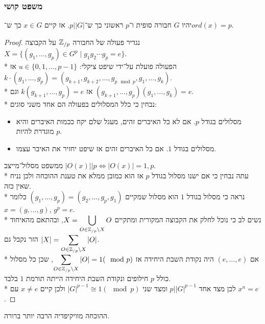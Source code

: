 \subsubsection{משפט קושי}
יהיו $G$ חבורה סופית ו־$p$ ראשוני כך ש־$p \Big| |G|$. אז קיים $x \in G$ כך ש־$ord(x) = p$.
\begin{proof}
	נגדיר פעולה של החבורה $\mathbb{Z}_{/p}$ על הקבוצה $X = \{ (g_1, \dots, g_p) \in G^p \mid g_1g_2 \cdots g_p = e\}$. \\*
	הפעולה פועלת על־ידי שיפט ציקלי: $u \in \{0, 1, \dots, p - 1\}$ אז $k \cdot (g_1, \dots, g_p) = (g_{k + 1}, g_{k + 2}, \dots, g_{p \mod p}, g_{1}, \dots, g_k)$.\\*
	אז $k (g_{k + 1}, \dots, g_p) = e$ וגם $(g_{k + 1}, \dots, g_p)(g_1, \dots, g_k) = e$. \\*
	נבחין כי כלל המסלולים בפעולה הם אחד משני סוגים:
	\begin{itemize}
		\item מסלולים בגודל $p$. אם לא כל האיברים זהים, מעגל שלם יקח ככמות האיברים והיא מוגדרת להיות $p$.
		\item מסלולים בגודל $1$. אם כל האיברים זהים אז שיפט יחזיר את האיבר עצמו.
	\end{itemize}
	ממשפט מסלול־מייצב $|O(x)| \Big| p \iff |O(x)| = 1, p$.\\*
	עתה נבחין כי אם ישנו מסלול בגודל $p$ אז הוא כמובן ממלא את טענת ההוכחה ולכן נניח שאין כזה. \\*
	נראה כי מסלול בגודל $1$ הוא מסלול שמקיים $(g_1, \dots, g_p) = (g_2, \dots, g_p, g_1)$ כלומר $x = (g, \dots, g)$, $g^p = e$.\\*
	נשים לב כי נוכל לחלק את הקבוצה המקורית ומתקיים $X = \displaystyle \bigcup_{O \in \mathbb{Z}_{/p} \backslash X} O$, ובהתאם מהאיחוד הזר נקבל גם $|X| = \displaystyle \sum_{O \in \mathbb{Z}_{/p} \backslash X} |O|$. \\*
	אם $(e, \dots, e)$ היה נקודת השבת היחידה אז $\displaystyle \sum_{O \in \mathbb{Z}_{/p} \backslash X} |O| = 1 (\mod p)$, שכן כל מסלול כולל $p$ חילופים ונקודת השבת היחידה הייתה תורמת $1$ בלבד. \\*
	לכן מצד אחד $p \Big| |G|^{p - 1}$ ומצד שני $|G|^{p - 1} \cong 1 (\mod p)$ ולכן קיים $x \ne e$ עם $x^n = e$.
\end{proof}
ההוכחה מוויקיפדיה הרבה יותר ברורה.


